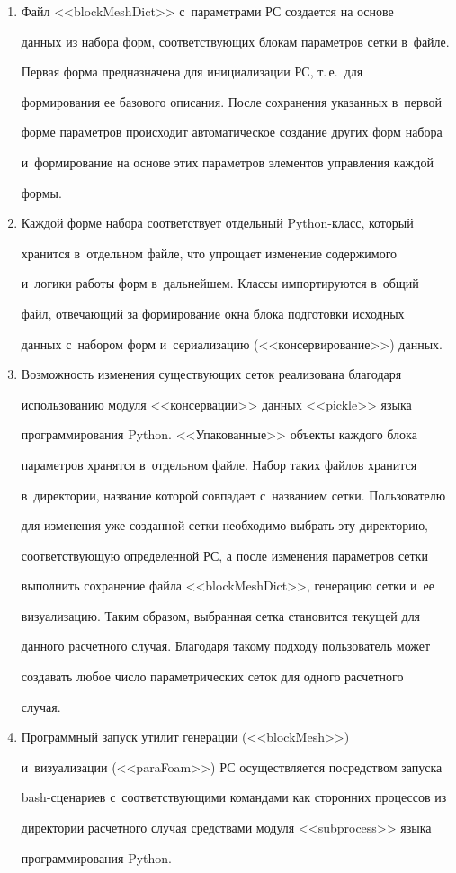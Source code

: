   \begin{enumerate}[1.]


\item Файл <<blockMeshDict>> с~параметрами РС создается на основе 


данных из набора форм, соответствующих блокам параметров сетки в~файле. 


Первая форма предназначена для инициализации РС, т.\,е.\ для 


формирования ее базового описания. После сохранения указанных в~первой 


форме параметров происходит автоматическое создание других форм набора 


и~формирование на основе этих параметров элементов управления каждой 


формы.


\item Каждой форме набора соответствует отдельный Python-класс, который 


хранится в~отдельном файле, что упрощает изменение содержимого 


и~логики работы форм в~дальнейшем. Классы импортируются в~общий 


файл, отвечающий за формирование окна блока подготовки исходных 


данных с~набором форм и~сериализацию (<<консервирование>>) данных.


\item Возможность изменения существующих сеток реализована благодаря 


использованию модуля <<консервации>> данных <<pickle>> языка 


программирования Python. <<Упакованные>> объекты каждого блока 


параметров хранятся в~отдельном файле. Набор таких файлов хранится 


в~директории, название которой совпадает с~названием сетки. Пользователю 


для изменения уже созданной сетки необходимо выбрать эту директорию, 


соответствующую определенной РС, а после изменения параметров сетки 


выполнить сохранение файла <<blockMeshDict>>, генерацию сетки и~ее 


визуализацию. Таким образом, выбранная сетка становится текущей для 


данного расчетного случая. Благодаря такому подходу пользователь может 


создавать любое число параметрических сеток для одного расчетного 


случая.


\item Программный запуск утилит генерации (<<blockMesh>>) 


и~визуализации (<<paraFoam>>) РС осуществляется посредством запуска 


bash-сценариев с~соответствующими командами как сторонних процессов из 


директории расчетного случая средствами модуля <<subprocess>> языка 


программирования Python. 


\end{enumerate}
